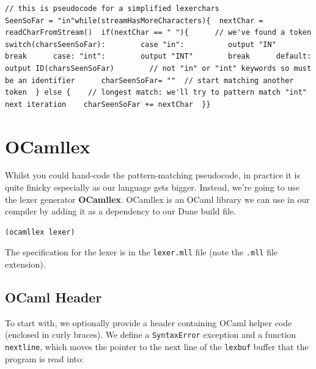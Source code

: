 \begin{verbatim}
// this is pseudocode for a simplified lexerchars
SeenSoFar = "in"while(streamHasMoreCharacters){  nextChar = readCharFromStream()  if(nextChar == " "){      // we've found a token      switch(charsSeenSoFar):        case "in":          output "IN"          break      case: "int":        output "INT"        break      default:        output ID(charsSeenSoFar)        // not "in" or "int" keywords so must be an identifier      charSeenSoFar= ""  // start matching another token  } else {    // longest match: we'll try to pattern match "int" next iteration    charSeenSoFar += nextChar  }}
\end{verbatim}

\hypertarget{ocamllex}{%
\section{\texorpdfstring{\protect\hyperlink{ocamllex}{}OCamllex}{OCamllex}}\label{ocamllex}}

Whilst you could hand-code the pattern-matching pseudocode, in practice
it is quite finicky especially as our language gets bigger. Instead,
we're going to use the lexer generator \textbf{OCamllex}. OCamllex is an
OCaml library we can use in our compiler by adding it as a dependency to
our Dune build file.

%

\begin{verbatim}
(ocamllex lexer)
\end{verbatim}

The specification for the lexer is in the \texttt{lexer.mll} file (note
the \texttt{.mll} file extension).

\hypertarget{ocaml-header}{%
\subsection{\texorpdfstring{\protect\hyperlink{ocaml-header}{}OCaml
Header}{OCaml Header}}\label{ocaml-header}}

To start with, we optionally provide a header containing OCaml helper
code (enclosed in curly braces). We define a \texttt{SyntaxError}
exception and a function \texttt{nextline}, which moves the pointer to
the next line of the \texttt{lexbuf} buffer that the program is read
into:

%

